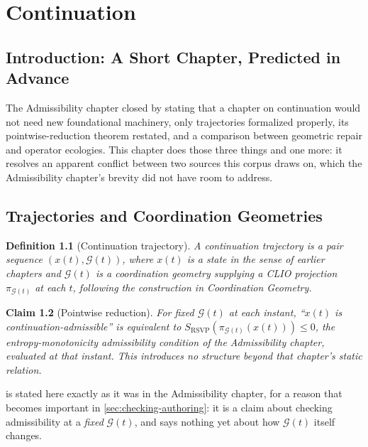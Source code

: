 \documentclass[12pt]{report}
\newtheorem{definition}{Definition}[section]
\newtheorem{claim}[definition]{Claim}
\begin{document}
\chapter{Continuation}

\section{Introduction: A Short Chapter, Predicted in Advance}

The Admissibility chapter closed by stating that a chapter on
continuation would not need new foundational machinery, only trajectories
formalized properly, its pointwise-reduction theorem restated, and a
comparison between geometric repair and operator ecologies. This chapter
does those three things and one more: it resolves an apparent conflict
between two sources this corpus draws on, which the Admissibility
chapter's brevity did not have room to address.

\section{Trajectories and Coordination Geometries}
\label{sec:trajectories}

\begin{definition}[Continuation trajectory]
\label{def:trajectory}
A continuation trajectory is a pair sequence $(x(t), \mathcal{G}(t))$,
where $x(t)$ is a state in the sense of earlier chapters and
$\mathcal{G}(t)$ is a coordination geometry supplying a CLIO projection
$\pi_{\mathcal{G}(t)}$ at each $t$, following the construction in
\emph{Coordination Geometry}.
\end{definition}

\begin{claim}[Pointwise reduction]
\label{thm:pointwise-recall}
For fixed $\mathcal{G}(t)$ at each instant, ``$x(t)$ is
continuation-admissible'' is equivalent to $S_{\mathrm{RSVP}}(\pi_{\mathcal{G}(t)}(x(t)))
\leq 0$, the entropy-monotonicity admissibility condition of the
Admissibility chapter, evaluated at that instant. This introduces no
structure beyond that chapter's static relation.
\end{claim}

 is stated here exactly as it was in the
Admissibility chapter, for a reason that becomes important in
\cref{sec:checking-authoring}: it is a claim about checking admissibility
at a \emph{fixed} $\mathcal{G}(t)$, and says nothing yet about how
$\mathcal{G}(t)$ itself changes.
\end{document}
